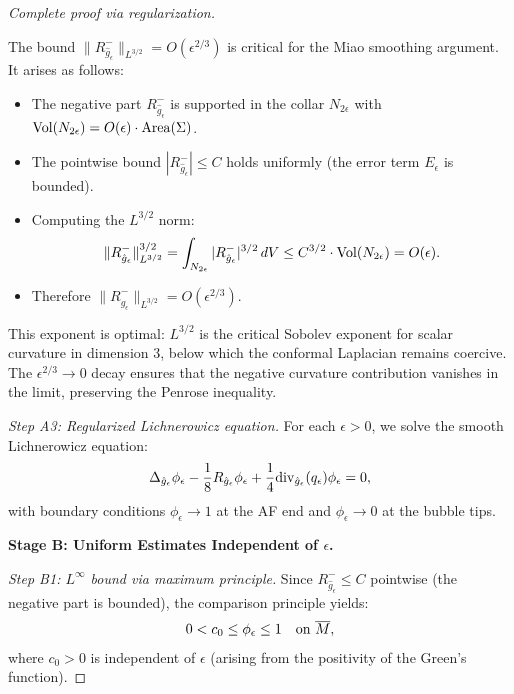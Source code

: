 \begin{proof}[Complete proof via regularization]
\begin{remark}\label{rem:EpsilonTwoThirds}
The bound $\|R_{\hat{g}_\epsilon}^-\|_{L^{3/2}} = O(\epsilon^{2/3})$ is critical for the Miao smoothing argument. It arises as follows:
\begin{itemize}
    \item The negative part $R_{\hat{g}_\epsilon}^-$ is supported in the collar $N_{2\epsilon}$ with $\operatorname{Vol}(N_{2\epsilon}) = O(\epsilon) \cdot \operatorname{Area}(\Sigma)$.
    \item The pointwise bound $|R_{\hat{g}_\epsilon}^-| \le C$ holds uniformly (the error term $E_\epsilon$ is bounded).
    \item Computing the $L^{3/2}$ norm:
    \begin{equation}
        \|R_{\hat{g}_\epsilon}^-\|_{L^{3/2}}^{3/2} = \int_{N_{2\epsilon}} |R_{\hat{g}_\epsilon}^-|^{3/2} \, dV \le C^{3/2} \cdot \operatorname{Vol}(N_{2\epsilon}) = O(\epsilon).
    \end{equation}
    \item Therefore $\|R_{\hat{g}_\epsilon}^-\|_{L^{3/2}} = O(\epsilon^{2/3})$.
\end{itemize}
This exponent is optimal: $L^{3/2}$ is the critical Sobolev exponent for scalar curvature in dimension 3, below which the conformal Laplacian remains coercive. The $\epsilon^{2/3} \to 0$ decay ensures that the negative curvature contribution vanishes in the limit, preserving the Penrose inequality.
\end{remark}

\textit{Step A3: Regularized Lichnerowicz equation.}
For each $\epsilon > 0$, we solve the smooth Lichnerowicz equation:
\begin{equation}\label{eq:RegLich}
    \Delta_{\hat{g}_\epsilon} \phi_\epsilon - \frac{1}{8} R_{\hat{g}_\epsilon} \phi_\epsilon + \frac{1}{4}\mathrm{div}_{\hat{g}_\epsilon}(q_\epsilon) \phi_\epsilon = 0,
\end{equation}
with boundary conditions $\phi_\epsilon \to 1$ at the AF end and $\phi_\epsilon \to 0$ at the bubble tips.

\textbf{Stage B: Uniform Estimates Independent of $\epsilon$.}

\textit{Step B1: $L^\infty$ bound via maximum principle.}
Since $R_{\hat{g}_\epsilon}^- \le C$ pointwise (the negative part is bounded), the comparison principle yields:
\begin{equation}
    0 < c_0 \le \phi_\epsilon \le 1 \quad \text{on } \overline{M},
\end{equation}
where $c_0 > 0$ is independent of $\epsilon$ (arising from the positivity of the Green's function).


\end{proof}
